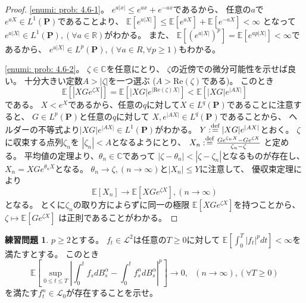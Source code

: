 \documentclass[uplatex]{jsarticle}
\theoremstyle{definition}
\newtheorem{prob}[prob]{練習問題}
\def\C{\mathbb{C}}
\def\R{\mathbb{R}}
\def\P{\mathbf{P}}
\def\E{\mathbb{E}}
\def\mcL{\mathcal{L}}
\def\dfn{:\overset{\mbox{{\scriptsize def}}}{=}}
\begin{document}
\begin{proof}
  \ref{enumi: prob: 4.6-1}。
  \(e^{a|x|} \leq e^{ax} + e^{-ax}\)であるから、
  任意の\(a\)で\(e^{aX}\in L^1(\P)\)であることより、
  \(\E[e^{a|X|}] \leq \E[e^{aX}] + \E[e^{-aX}] < \infty\)
  となって\(e^{a|X|}\in L^1(\P), (\forall a\in \R)\)がわかる。
  また、
  \(\E[(e^{a|X|})^p] = \E[e^{ap|X|}] < \infty\)であるから、
  \(e^{a|X|}\in L^p(\P), (\forall a\in R, \forall p\geq 1)\)もわかる。

  \ref{enumi: prob: 4.6-2}。
  \(\zeta\in \C\)を任意にとり、
  \(\zeta\)の近傍での微分可能性を示せば良い。
  十分大きい定数\(A > |\zeta|\)を一つ選ぶ
  (\(A>\mathrm{Re}(\zeta)\)である)。
  このとき
  \[
  \E\left[ \left| XGe^{\zeta X}\right|\right]
  = \E \left[ |XG|e^{|\mathrm{Re}(\zeta)X|}\right]
  < \E \left[ |XG|e^{|AX|}\right]
  \]
  である。
  \(X < e^X\)であるから、任意の\(q\)に対して\(X\in L^q(\P)\)であることに注意すると、
  \(G\in L^p(\P)\)と任意の\(q\)に対して
  \(X,e^{|AX|}\in L^q(\P)\)であることから、
  ヘルダーの不等式より\(|XG|e^{|AX|}\in L^1(\P)\)がわかる。
  \(Y\dfn |XG|e^{|AX|}\)とおく。
  \(\zeta\)に収束する点列\(\zeta_n\)を
  \(|\zeta_n| < A\)となるようにとり、
  \(X_n\dfn \frac{Ge^{\zeta_nX}-Ge^{\zeta X}}{\zeta_n - \zeta}\)
  と定める。
  平均値の定理より、\(\theta_n\in \C\)であって
  \(|\zeta - \theta_n| < |\zeta - \zeta_n|\)となるものが存在し、
  \(X_n = XGe^{\theta_n X}\)となる。
  \(\theta_n \to \zeta , (n\to \infty)\)と\(|X_n| \leq Y\)に注意して、
  優収束定理により
  \[
  \E\left[ X_n\right] \to \E\left[ XGe^{\zeta X}\right], (n\to\infty)
  \]
  となる。
  とくに\(\zeta_n\)の取り方によらずに同一の極限
  \(\E\left[ XGe^{\zeta X}\right]\)を持つことから、
  \(\zeta \mapsto \E\left[ Ge^{\zeta X}\right]\)
  は正則であることがわかる。
\end{proof}










\begin{prob}\label{prob: 4.7}
  \(p\geq 2\)とする。
  \(f_t\in \mcL^2\)は任意の\(T\geq 0\)に対して
  \(\E\left[ \int_0^T|f_t|^pdt\right] < \infty\)を満たすとする。
  このとき
  \[
  \E\left[ \sup_{0\leq t\leq T}\left|
  \int_0^tf_sdB_s^\alpha - \int_0^tf_s^ndB_s^\alpha \right|^p\right] \to 0
  , \ \ \ (n\to\infty), (\forall T\geq 0)
  \]
  を満たす\(f_t^n\in \mcL_0\)が存在することを示せ。
\end{prob}
\end{document}

